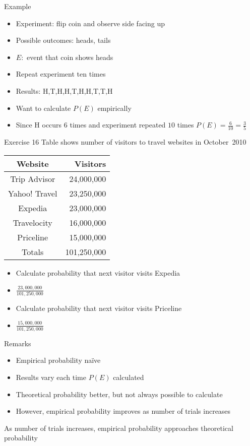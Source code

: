\documentclass[handout]{beamer}
\theoremstyle{definition}
\begin{document}
\begin{frame}{Example}
\begin{itemize}
\item Experiment: flip coin and observe side facing up
\item Possible outcomes: heads, tails
\item $E:$ event that coin shows heads
\item Repeat experiment ten times
\item Results: H,T,H,H,T,H,H,T,T,H
\item Want to calculate $P\left(E\right)$ empirically
\item Since H occurs $6$ times
and experiment repeated $10$ times
$P\left(E\right)=\frac{6}{10}=\frac{3}{5}$
\end{itemize}
\end{frame}

\begin{frame}{Exercise 16}
Table shows number of visitors to travel websites in October~2010
\begin{center}\begin{tabular}{cr}
Website&Visitors\\\hline
Trip Advisor&24,000,000\\
Yahoo! Travel&23,250,000\\
Expedia&23,000,000\\
Travelocity&16,000,000\\
Priceline&15,000,000\\\hline
Totals&101,250,000
\end{tabular}\end{center}
\begin{itemize}
\item Calculate probability that next visitor visits Expedia
\item $\frac{23,000,000}{101,250,000}$
\item Calculate probability that next visitor visits Priceline 
\item $\frac{15,000,000}{101,250,000}$
\end{itemize}
\end{frame}

\begin{frame}{Remarks}
\begin{itemize}
\item Empirical probability na\"ive
\item Results vary each time $P\left(E\right)$ calculated
\item Theoretical probability better, but not always possible to calculate
\item However, empirical probability improves
as number of trials increases
\end{itemize}
\begin{theorem}
As number of trials increases, empirical probability
approaches theoretical probability
\end{theorem}
\end{frame}
\end{document}
